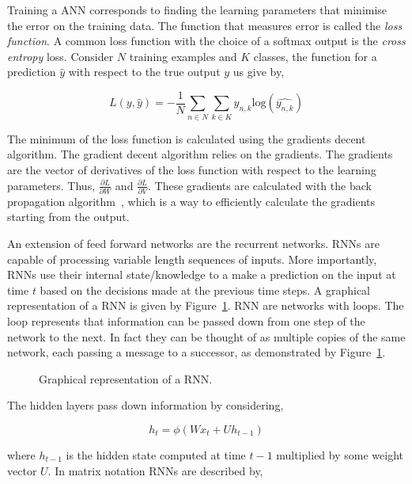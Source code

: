 Training a ANN corresponds to finding the learning parameters that minimise
the error on the training data. The function that measures error is called
the \textit{loss function}. A common loss function with the choice of
a softmax output is the \textit{cross entropy} loss. Consider \(N\) training
examples and \(K\) classes, the function for a prediction \(\hat{y}\) with
respect to the true output \(y\) us give by,

\[L(y, \hat{y}) = - \frac{1}{N} \sum_{n\in N} \sum_{k \in K} y_{n, k} \text{log}(\hat{y_{n, k}})\]

The minimum of the loss function is calculated using the gradients decent
algorithm. The gradient decent algorithm relies on the gradients. The gradients
are the vector of derivatives of the loss function with respect to the learning
parameters. Thus, \(\frac{\partial{L}}{\partial{W}}\) and
\(\frac{\partial{L}}{\partial{V}}\). These gradients are calculated with the
back propagation algorithm~\cite{Wythoff1993}, which is a way to efficiently
calculate the gradients starting from the output.

An extension of feed forward networks are the recurrent networks. RNNs are
capable of processing variable length sequences of inputs. More importantly,
RNNs use their internal state/knowledge to a make a prediction on the input at
time \(t\) based on the decisions made at the previous time steps. A graphical
representation of a RNN is given by Figure~\ref{fig:rnn}. RNN are networks with
loops. The loop represents that information can be passed down from one step of
the network to the next. In fact they can be thought of as multiple copies of
the same network, each passing a message to a successor, as demonstrated by
Figure~\ref{fig:rnn}.

\begin{figure}[!htbp]
    \centering
    
    \caption{Graphical representation of a RNN.}\label{fig:rnn}
\end{figure}

The hidden layers pass down information by considering,

\begin{equation*}
    h_t = \phi(Wx_t + Uh_{t-1})
\end{equation*}

where \(h_{t-1}\) is the hidden state computed at time \(t-1\) multiplied by
some weight vector \(U\). In matrix notation RNNs are described by,

